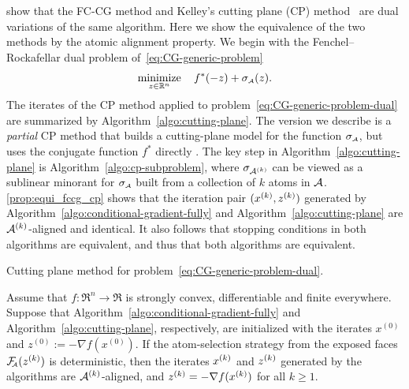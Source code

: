 \citet{bertsekas2011unifying} show that the FC-CG method and Kelley’s cutting
plane (CP) method~\cite{kelley1960cutting} are dual variations of the same
algorithm. Here we show the equivalence of the two methods by the atomic alignment
property. We begin with the Fenchel–Rockafellar dual problem
of~\eqref{eq:CG-generic-problem}
\begin{equation} \label{eq:CG-generic-problem-dual}
     \displaystyle\mathop{\hbox{\rm minimize}}_{z\in\mathbb{R}^n}\enspace\enspace f^*(-z) + \sigma_{\scriptscriptstyle\mathcal{A}}(z).
\end{equation} 
The iterates of the CP method applied to
problem~\eqref{eq:CG-generic-problem-dual} are summarized by
Algorithm~\ref{algo:cutting-plane}. The version we describe is a \emph{partial} CP method that builds a cutting-plane model for the function $\sigma_{\scriptscriptstyle\mathcal{A}}$, but uses the
conjugate function  $f^*$ directly \citep{fan2019bundle}. The key step in
Algorithm~\ref{algo:cutting-plane} is Algorithm~\ref{algo:cp-subproblem}, where $\sigma_{\mathcal{A}^{(k)}}$
can be viewed as a sublinear minorant for $\sigma_{\scriptscriptstyle\mathcal{A}}$ built from a collection of
$k$ atoms in $\mathcal{A}$. \autoref{prop:equi_fccg_cp} shows that the iteration pair
$(x^{(k)},z^{(k)})$ generated by
Algorithm~\ref{algo:conditional-gradient-fully} and Algorithm~\ref{algo:cutting-plane} are $\mathcal{A}^{(k)}$-aligned
and identical.
It also follows that stopping conditions in both algorithms are equivalent, and thus that both algorithms are equivalent.

\begin{algorithm}[t]
  \DontPrintSemicolon\setcounter{AlgoLine}{-1}
  \caption{Cutting plane method for problem~\eqref{eq:CG-generic-problem-dual}.}
  \label{algo:cutting-plane}
\end{algorithm}

\begin{proposition}
  \label{prop:equi_fccg_cp}
    Assume that $f:\Re^n\to\Re$ is strongly convex, differentiable and finite everywhere.
    Suppose that Algorithm~\ref{algo:conditional-gradient-fully} and Algorithm~\ref{algo:cutting-plane},
    respectively, are initialized with the iterates $x^{(0)}$ and $z^{(0)} :=
    -\nabla f(x^{(0)})$. If the atom-selection strategy from the exposed faces
    $\mathcal{F}_{\!\!\scriptscriptstyle\mathcal{A}}(z^{(k)})$ is deterministic, then the iterates $x^{(k)}$ and $z^{(k)}$ generated by
    the algorithms are $\mathcal{A}^{(k)}$-aligned, and $z^{(k)} = -\nabla f(x^{(k)})$ for all
    $k\ge1$.
\end{proposition}


